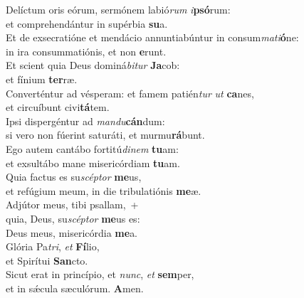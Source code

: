 \oddverse Delíctum oris eórum, sermónem labió\textit{rum} \textit{i}\textbf{psó}rum:~\*\\
\oddverse et comprehendántur in supérbia \textbf{su}a.\\
\evenverse Et de exsecratióne et mendácio annuntiabúntur in consum\textit{ma}\textit{ti}\textbf{ó}ne:~\*\\
\evenverse in ira consummatiónis, et non \textbf{e}runt.\\
\oddverse Et scient quia Deus dominá\textit{bi}\textit{tur} \textbf{Ja}cob:~\*\\
\oddverse et fínium \textbf{ter}ræ.\\
\evenverse Converténtur ad vésperam: et famem patién\textit{tur} \textit{ut} \textbf{ca}nes,~\*\\
\evenverse et circuíbunt civi\textbf{tá}tem.\\
\oddverse Ipsi dispergéntur ad \textit{man}\textit{du}\textbf{cán}dum:~\*\\
\oddverse si vero non fúerint saturáti, et murmu\textbf{rá}bunt.\\
\evenverse Ego autem cantábo fortitú\textit{di}\textit{nem} \textbf{tu}am:~\*\\
\evenverse et exsultábo mane misericórdiam \textbf{tu}am.\\
\oddverse Quia factus es su\textit{scép}\textit{tor} \textbf{me}us,~\*\\
\oddverse et refúgium meum, in die tribulatiónis \textbf{me}æ.\\
\evenverse Adjútor meus, tibi psallam,~+\\
\evenverse  quia, Deus, su\textit{scép}\textit{tor} \textbf{me}us es:~\*\\
\evenverse Deus meus, misericórdia \textbf{me}a.\\
\oddverse Glória Pa\textit{tri}, \textit{et} \textbf{Fí}lio,~\*\\
\oddverse et Spirítui \textbf{San}cto.\\
\evenverse Sicut erat in princípio, et \textit{nunc}, \textit{et} \textbf{sem}per,~\*\\
\evenverse et in sǽcula sæculórum. \textbf{A}men.\\
